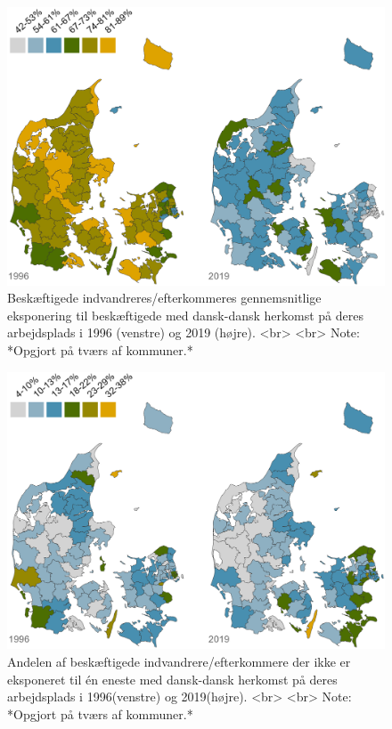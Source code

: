 \documentclass[
]{book}
\begin{document}
\begin{figure}
\includegraphics[width=1\linewidth]{images/Figur_4_4} \caption{Beskæftigede indvandreres/efterkommeres gennemsnitlige eksponering til beskæftigede med dansk-dansk herkomst på deres arbejdsplads i 1996 (venstre) og 2019 (højre). <br> <br> Note: *Opgjort på tværs af kommuner.*}\label{fig:fig-4-4}
\end{figure}

\begin{figure}
\includegraphics[width=1\linewidth]{images/Figur_4_5} \caption{Andelen af beskæftigede indvandrere/efterkommere der ikke er eksponeret til én eneste med dansk-dansk herkomst på deres arbejdsplads i 1996(venstre) og 2019(højre). <br> <br> Note: *Opgjort på tværs af kommuner.*}\label{fig:fig-4-5}
\end{figure}
\end{document}
